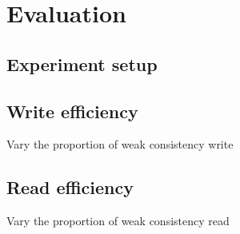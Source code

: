 \section{Evaluation}
\label{sec:eval}

\subsection{Experiment setup}


\subsection{Write efficiency}
Vary the proportion of weak consistency write



\subsection{Read efficiency}
Vary the proportion of weak consistency read



